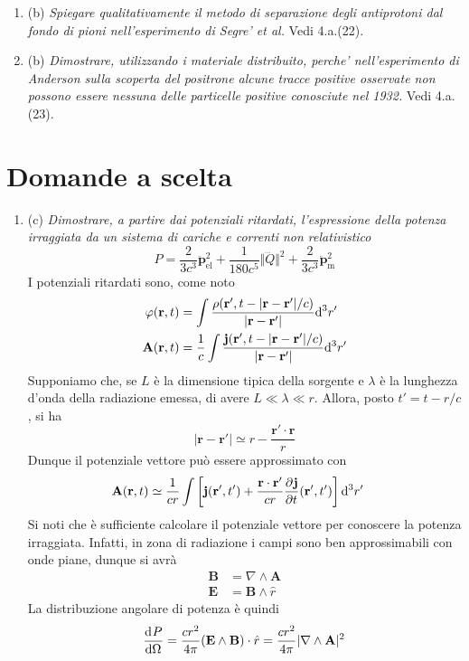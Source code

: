 \documentclass{article}
\renewcommand{\b}{(b)}
\renewcommand{\c}{(c)}
\renewcommand{\t}[1]{\textit{ #1}}
\renewcommand{\vec}[1]{\mathbf{#1}}
\begin{document}
\begin{enumerate}
		\item\b\t{Spiegare qualitativamente il metodo di separazione degli antiprotoni dal fondo di
			pioni nell’esperimento di Segre’ et al.}
		Vedi 4.a.(22).
		\item\b\t{Dimostrare, utilizzando i materiale distribuito, perche’ nell’esperimento di
			Anderson sulla scoperta del positrone alcune tracce positive osservate non
			possono essere nessuna delle particelle positive conosciute nel 1932.} Vedi 4.a.(23).
	\end{enumerate}

\section{Domande a scelta}
\begin{enumerate}
	\item\c\t{Dimostrare, a partire dai potenziali ritardati, l'espressione della potenza irraggiata
		da un sistema di cariche e correnti non relativistico \[P = \frac{2}{3c^3}\ddot{\vec{p}}_\textrm{el}^2+ \frac{1}{180 c^5}\Vert\dddot{Q}\Vert^2+\frac{2}{3c^3}\ddot{\vec{p}}_\textrm{m}^2
		\]} I potenziali ritardati sono, come noto
	\begin{align*}
		\varphi(\vec{r},t)&=\int\frac{\rho(\vec{r}',t-|\vec{r}-\vec{r}'|/c)}{|\vec{r}-\vec{r}'|}\d ^3r'\\\vec{A}(\vec{r},t)&=\frac{1}{c}\int\frac{\vec{j}(\vec{r}',t-|\vec{r}-\vec{r}'|/c)}{|\vec{r}-\vec{r}'|}\d ^3r'
	\end{align*}
	Supponiamo che, se $L$ è la dimensione tipica della sorgente e $\lambda$ è la lunghezza d'onda della radiazione emessa, di avere $L\ll\lambda\ll r$. Allora, posto $t'=t-r/c$, si ha
	\[|\vec{r}-\vec{r}'|\simeq r-\frac{\vec{r}'\cdot\vec{r}}{r}\]
	Dunque il potenziale vettore può essere approssimato con
	\begin{align*}
		\vec{A}(\vec{r},t)&\simeq\frac{1}{cr}\int\left[\vec{j}(\vec{r}',t')+\frac{\vec{r}\cdot\vec{r}'}{cr}\pder{\vec{j}}{t}(\vec{r}',t')\right]\d ^3r'
	\end{align*}
	Si noti che è sufficiente calcolare il potenziale vettore per conoscere la potenza irraggiata. Infatti, in zona di radiazione i campi sono ben approssimabili con onde piane, dunque si avrà
	\begin{align*}
		\vec{B}&=\nabla\wedge\vec{A}\\\vec{E}&=\vec{B}\wedge\hat{r}
	\end{align*}
	La distribuzione angolare di potenza è quindi
	\[\der{P}{\Omega}=\frac{cr^2}{4\pi}(\vec{E}\wedge\vec{B})\cdot\hat{r}=\frac{cr^2}{4\pi}|\nabla\wedge\vec{A}|^2\]

\end{enumerate}
\end{document}
